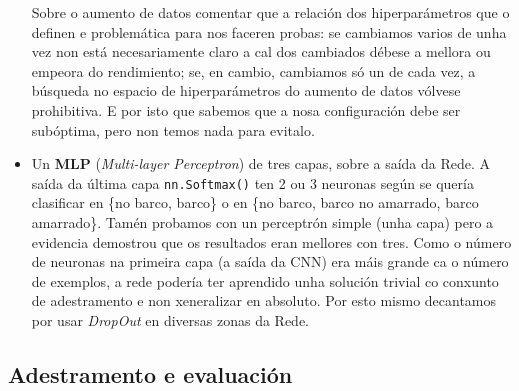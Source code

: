 \documentclass{article}
\begin{document}
\begin{itemize}
Sobre o aumento de datos comentar que a relación dos hiperparámetros que o definen e problemática para nos faceren probas: se cambiamos varios de unha vez non está necesariamente claro a cal dos cambiados débese a mellora ou empeora do rendimiento; se, en cambio, cambiamos só un de cada vez, a búsqueda no espacio de hiperparámetros do aumento de datos vólvese prohibitiva. E por isto que sabemos que a nosa configuración debe ser subóptima, pero non temos nada para evitalo.
\item Un \textbf{MLP} (\emph{Multi-layer Perceptron}) de tres capas, sobre a saída da Rede. A saída da última capa \texttt{nn.Softmax()} ten 2 ou 3 neuronas según se quería clasificar en \{no barco, barco\} o en \{no barco, barco no amarrado, barco amarrado\}. Tamén probamos con un perceptrón simple (unha capa) pero a evidencia demostrou que os resultados eran mellores con tres. Como o número de neuronas na primeira capa (a saída da CNN) era máis grande ca o número de exemplos, a rede podería ter aprendido unha solución trivial co conxunto de adestramento e non xeneralizar en absoluto. Por esto mismo decantamos por usar \emph{DropOut} \cite{srivastava2014dropout} en diversas zonas da Rede. 
\end{itemize}

\subsection{Adestramento e evaluación}
\end{document}
